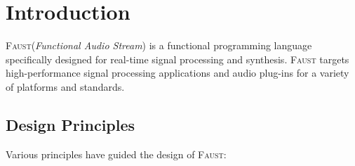 \documentclass[a4paper,10pt]{book}
\begin{document}
\newcommand{\faust}{\textsc{Faust}\xspace}
\newcommand{\latex}{\LaTeX\xspace}
\newcommand{\ircam}{\textsc{Ircam}\xspace}
\newcommand{\astree}{\textsc{Astree}\xspace}
\newcommand{\svg}{\textsc{Svg}\xspace}


\setlength{\parindent}{0pt}
\setlength{\parskip}{1ex plus 0.5ex minus 0.2ex}

\maketitle

\tableofcontents

\chapter{Introduction}

\faust (\textit{Functional Audio Stream}) is a functional programming language specifically designed for real-time signal processing and synthesis.  \faust targets high-performance signal processing applications and audio plug-ins for a variety of platforms and standards. 

\section{Design Principles} 

Various principles have guided the design of \faust :
\end{document}

